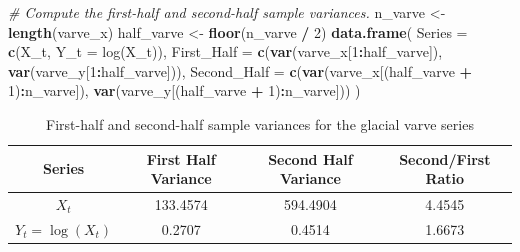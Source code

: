 \documentclass[
  10pt,
]{extarticle}
\newenvironment{Shaded}{\begin{snugshade}}{\end{snugshade}}
\newcommand{\AttributeTok}[1]{\textcolor[rgb]{0.13,0.29,0.53}{#1}}
\newcommand{\CommentTok}[1]{\textcolor[rgb]{0.56,0.35,0.01}{\textit{#1}}}
\newcommand{\DecValTok}[1]{\textcolor[rgb]{0.00,0.00,0.81}{#1}}
\newcommand{\FunctionTok}[1]{\textcolor[rgb]{0.13,0.29,0.53}{\textbf{#1}}}
\newcommand{\NormalTok}[1]{#1}
\newcommand{\OtherTok}[1]{\textcolor[rgb]{0.56,0.35,0.01}{#1}}
\newcommand{\SpecialCharTok}[1]{\textcolor[rgb]{0.81,0.36,0.00}{\textbf{#1}}}
\newcommand{\StringTok}[1]{\textcolor[rgb]{0.31,0.60,0.02}{#1}}
\begin{document}
\begin{Shaded}
\begin{Highlighting}[]
\CommentTok{\# Compute the first{-}half and second{-}half sample variances.}
\NormalTok{n\_varve }\OtherTok{\textless{}{-}} \FunctionTok{length}\NormalTok{(varve\_x)}
\NormalTok{half\_varve }\OtherTok{\textless{}{-}} \FunctionTok{floor}\NormalTok{(n\_varve }\SpecialCharTok{/} \DecValTok{2}\NormalTok{)}
\FunctionTok{data.frame}\NormalTok{(}
  \AttributeTok{Series =} \FunctionTok{c}\NormalTok{(}\StringTok{\textquotesingle{}X\_t\textquotesingle{}}\NormalTok{, }\StringTok{\textquotesingle{}Y\_t = log(X\_t)\textquotesingle{}}\NormalTok{),}
  \AttributeTok{First\_Half =} \FunctionTok{c}\NormalTok{(}\FunctionTok{var}\NormalTok{(varve\_x[}\DecValTok{1}\SpecialCharTok{:}\NormalTok{half\_varve]), }\FunctionTok{var}\NormalTok{(varve\_y[}\DecValTok{1}\SpecialCharTok{:}\NormalTok{half\_varve])),}
  \AttributeTok{Second\_Half =} \FunctionTok{c}\NormalTok{(}\FunctionTok{var}\NormalTok{(varve\_x[(half\_varve }\SpecialCharTok{+} \DecValTok{1}\NormalTok{)}\SpecialCharTok{:}\NormalTok{n\_varve]), }\FunctionTok{var}\NormalTok{(varve\_y[(half\_varve }\SpecialCharTok{+} \DecValTok{1}\NormalTok{)}\SpecialCharTok{:}\NormalTok{n\_varve]))}
\NormalTok{)}
\end{Highlighting}
\end{Shaded}

\begin{center}
\normalsize
\begin{table}[H]

\caption{\label{tab:p1a-variance-table}First-half and second-half sample variances for the glacial varve series}
\centering
\begin{tabular}[t]{cccc}
\toprule
Series & First Half Variance & Second Half Variance & Second/First Ratio\\
\midrule
$X_t$ & 133.4574 & 594.4904 & 4.4545\\
$Y_t=\log(X_t)$ & 0.2707 & 0.4514 & 1.6673\\
\bottomrule
\end{tabular}
\end{table}
\normalsize
\end{center}
\end{document}
